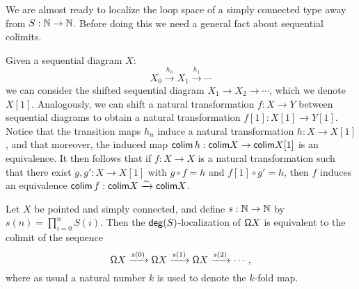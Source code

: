We are almost ready to localize the loop space of a simply connected type away from $S : \mathbb{N} \to \mathbb{N}$.
Before doing this we need a general fact about sequential colimits.

\begin{rmk}\label{remark:equivalenceofseqcolim}
Given a sequential diagram $X$:
\[
    X_0 \xrightarrow{h_0} X_1 \xrightarrow{h_1} \cdots
\]
we can consider the shifted sequential diagram $X_1 \to X_2 \to \cdots$, which we denote $X[1]$.
Analogously, we can shift a natural transformation $f : X \to Y$ between sequential
diagrams to obtain a natural transformation $f[1] : X[1] \to Y[1]$.
Notice that the transition maps $h_n$ induce a natural transformation $h : X \to X[1]$, and that moreover, the
induced map $\mathsf{colim}\, h : \mathsf{colim} X \to \mathsf{colim} X[1]$ is an equivalence.
It then follows that if $f : X \to X$ is a natural transformation such that there exist $g, g' : X \to X[1]$
with $g \circ f = h$ and $f[1] \circ g' = h$, then $f$ induces an equivalence $\mathsf{colim}\, f : \mathsf{colim} X \xrightarrow{\sim} \mathsf{colim} X$.
\end{rmk}

\begin{thm}\label{theorem:localizationastelescope}
    Let $X$ be pointed and simply connected, and
    define $s : \mathbb{N} \to \mathbb{N}$ by $s(n) = \prod_{i=0}^n S(i)$.
    Then the $\mathsf{deg}(S)$-localization of $\mathsf{\Omega} X$ is equivalent to the colimit of the sequence
    \[\mathsf{\Omega} X \xrightarrow{s(0)}\mathsf{\Omega} X \xrightarrow{s(1)} \mathsf{\Omega} X \xrightarrow{s(2)} \cdots, \]
    where as usual a natural number $k$ is used to denote the $k$-fold map.
\end{thm}

